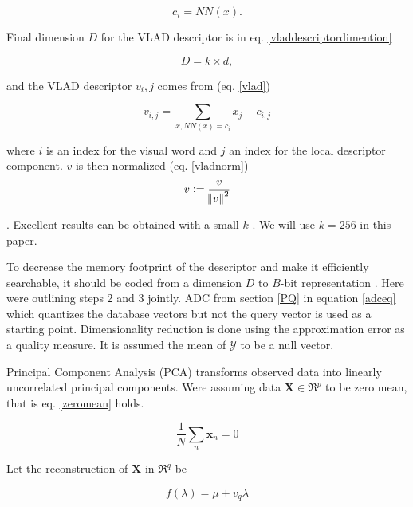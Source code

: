 \documentclass[english,12pt,a4paper,pdftex,elec,utf8, table]{aaltothesis}
\begin{document}
\begin{equation}
  \label{vladdescriptortovw}
c_i = NN(x).
\end{equation}

Final dimension $D$ for the VLAD descriptor is in eq. \ref{vladdescriptordimention}

\begin{equation}
  \label{vladdescriptordimention}
  D = k \times d,
\end{equation}

and the VLAD descriptor $v_i,j$ comes from (eq. \ref{vlad})

\begin{equation}
  \label{vlad}
  v_{i,j} = \sum_{x, NN(x)=c_i} x_j - c_{i,j}
\end{equation}

where $i$ is an index for the visual word and $j$ an index for the local descriptor component. $v$ is then normalized (eq. \ref{vladnorm})
\begin{equation}
  \label{vladnorm}
  v := \frac{v}{\norm{v}^2}
  \end{equation}

.\cite{Jegou2014} Excellent results can be obtained with a small $k$ \cite{Jegou2014}. We will use $k=256$ in this paper.

To decrease the memory footprint of the descriptor and make it efficiently searchable, it should be coded from a dimension $D$ to $B$-bit representation \cite{Jegou2014}. Here were outlining steps 2 and 3 jointly. ADC from section \ref{PQ} in equation \ref{adceq} which quantizes the database vectors but not the query vector is used as a starting point. Dimensionality reduction is done using the approximation error as a quality measure. It is assumed the mean of $\mathcal{Y}$ to be a null vector.\cite{Jegou2014}

Principal Component Analysis (PCA) transforms observed data into linearly uncorrelated principal components. Were assuming data $\boldsymbol{X} \in \Re^{p}$ to be zero mean, that is eq. \ref{zeromean} holds.

\begin{equation}\label{zeromean}
\frac{1}{N}\sum_n \boldsymbol{x}_n = 0
\end{equation}

Let the reconstruction of $\boldsymbol{X}$ in $\Re^{q}$ be

\begin{equation} \label{pca}
f(\lambda) = \mu + v_q\lambda
\end{equation}
\end{document}
